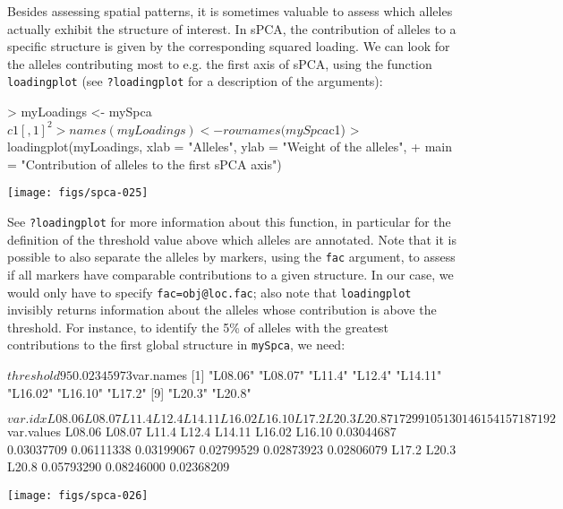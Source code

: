 \documentclass{article}
\begin{document}
Besides assessing spatial patterns, it is sometimes valuable to assess which alleles actually
exhibit the structure of interest.
In sPCA, the contribution of alleles to a specific structure is given by the corresponding squared loading.
We can look for the alleles contributing most to e.g. the first axis
of sPCA, using the function \texttt{loadingplot} (see \texttt{?loadingplot} for
a description of the arguments):
\begin{Schunk}
\begin{Sinput}
> myLoadings <- mySpca$c1[, 1]^2
> names(myLoadings) <- rownames(mySpca$c1)
> loadingplot(myLoadings, xlab = "Alleles", ylab = "Weight of the alleles", 
+     main = "Contribution of alleles \n to the first sPCA axis")
\end{Sinput}
\end{Schunk}
\texttt{[image: figs/spca-025]}

\noindent See \texttt{?loadingplot} for more information about this
function, in particular for the definition of the threshold value
above which alleles are annotated.
Note that it is possible to also separate the alleles by markers,
using the \texttt{fac} argument, to assess if all markers have
comparable contributions to a given structure.
In our case, we would only have to specify \texttt{fac=obj@loc.fac};
also note that \texttt{loadingplot} invisibly returns information
about the alleles whose contribution is above the threshold.
For instance, to identify the 5\% of alleles with the greatest
contributions to the first global structure in \texttt{mySpca}, we need:
\begin{Schunk}
\begin{Soutput}
$threshold
       95% 
0.02345973 

$var.names
 [1] "L08.06" "L08.07" "L11.4"  "L12.4"  "L14.11" "L16.02" "L16.10" "L17.2" 
 [9] "L20.3"  "L20.8" 

$var.idx
L08.06 L08.07  L11.4  L12.4 L14.11 L16.02 L16.10  L17.2  L20.3  L20.8 
    71     72     99    105    130    146    154    157    187    192 

$var.values
    L08.06     L08.07      L11.4      L12.4     L14.11     L16.02     L16.10 
0.03044687 0.03037709 0.06111338 0.03199067 0.02799529 0.02873923 0.02806079 
     L17.2      L20.3      L20.8 
0.05793290 0.08246000 0.02368209 
\end{Soutput}
\end{Schunk}
\texttt{[image: figs/spca-026]}
\end{document}
